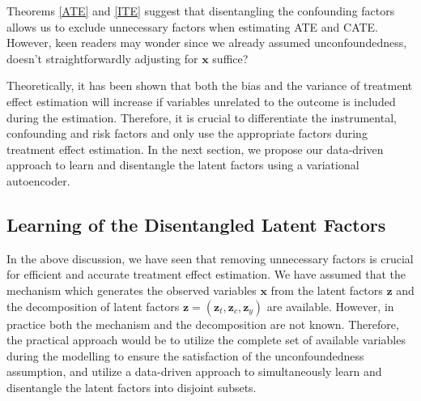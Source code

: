 \documentclass[letterpaper]{article} %
\newtheorem{theorem}{Theorem}
\begin{document}
Theorems \ref{ATE} and \ref{ITE} suggest that disentangling the confounding factors allows us to exclude unnecessary factors when estimating ATE and CATE. However, keen readers may wonder since we already assumed unconfoundedness, doesn't straightforwardly adjusting for $\mathbf{x}$ suffice? 

Theoretically, it has been shown that both the bias \cite{Abadie2006} and the variance \cite{Hahn1998} of treatment effect estimation will increase if variables unrelated to the outcome is included during the estimation. Therefore, it is crucial to differentiate the instrumental, confounding and risk factors and only use the appropriate factors during treatment effect estimation. 
In the next section, we propose our data-driven approach to learn and disentangle the latent factors using a variational autoencoder.


\subsection*{Learning of the Disentangled Latent Factors}


In the above discussion, we have seen that removing unnecessary factors is crucial for efficient and accurate treatment effect estimation. We have assumed that the mechanism which generates the observed variables $\mathbf{x}$ from the latent factors $\mathbf{z}$ and the decomposition of latent factors $\mathbf{z} = (\mathbf{z}_t, \mathbf{z}_c, \mathbf{z}_y)$ are available.
However, in practice both the mechanism and the decomposition are not known. Therefore, the practical approach would be to utilize the complete set of available variables during the modelling to ensure the satisfaction of the unconfoundedness assumption, and utilize a data-driven approach to simultaneously learn and disentangle the latent factors into disjoint subsets.
\end{document}
